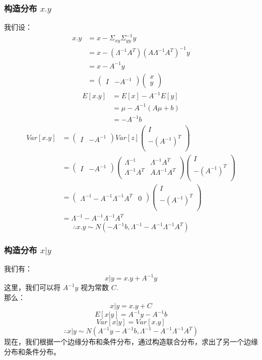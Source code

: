 \documentclass{report}
\begin{document}
\subsubsection{构造分布 $x.y$}
我们设：
$$
\begin{aligned}
x.y 
&= x - \Sigma_{xy} \Sigma_{yy}^{-1}y\\
&= x - (\Lambda^{-1} A^T)(A \Lambda^{-1}A^T)^{-1}y\\
&= x - A^{-1}y\\
&= 
\left ( \begin{matrix}
I& -A^{-1}
\end{matrix} \right )
\left ( \begin{matrix}
x\\
y
\end{matrix} \right )
\end{aligned}
$$
$$
\begin{aligned}
E[x.y] 
&= E[x] - A^{-1} E[y]\\
&= \mu - A^{-1}(A\mu+b)\\
&= -A^{-1}b
\end{aligned}
$$
$$
\begin{aligned}
Var[x.y]
&= 
\left ( \begin{matrix}
I& -A^{-1}
\end{matrix} \right )
Var[z]
\left ( \begin{matrix}
I\\
-(A^{-1})^T\\
\end{matrix} \right )\\
&= 
\left ( \begin{matrix}
I& -A^{-1}
\end{matrix} \right )
\left (
\begin{matrix}
\Lambda^{-1}&\Lambda^{-1}A^T\\
\Lambda^{-1}A^T&A\Lambda^{-1} A^T\\
\end{matrix}
\right )
\left ( \begin{matrix}
I\\
-(A^{-1})^T\\
\end{matrix} \right )\\
&=
\left ( \begin{matrix}
\Lambda^{-1}-A^{-1} \Lambda^{-1}A^T & 0
\end{matrix} \right )
\left ( \begin{matrix}
I\\
-(A^{-1})^T\\
\end{matrix} \right )\\
&=\Lambda^{-1}-A^{-1} \Lambda^{-1}A^T
\end{aligned}
$$
$$
\therefore x.y \sim N(-A^{-1}b, \Lambda^{-1}-A^{-1} \Lambda^{-1}A^T)
$$
\subsubsection{构造分布 $x|y$}
我们有：
$$
x|y = x.y + A^{-1}y
$$
这里，我们可以将 $A^{-1}y$ 视为常数 $C$.\\
那么：
$$
x|y = x.y + C
$$
$$
E[x|y] = A^{-1}y - A^{-1}b
$$
$$
Var[x|y]= Var[x.y]
$$
$$
\therefore x|y \sim N(A^{-1}y - A^{-1}b, \Lambda^{-1}-A^{-1} \Lambda^{-1}A^T)
$$
现在，我们根据一个边缘分布和条件分布，通过构造联合分布，求出了另一个边缘分布和条件分布。
\end{document}
